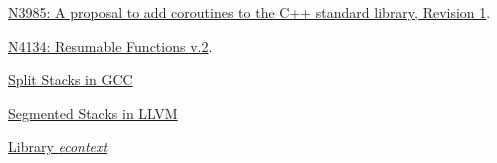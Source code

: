 \newpage
{}
\begin{thebibliography}{99}

        \href{http://www.open-std.org/jtc1/sc22/wg21/docs/papers/2014/n3985.pdf}
        {N3985: A proposal to add coroutines to the C++ standard library, Revision 1}.

        \href{http://www.open-std.org/jtc1/sc22/wg21/docs/papers/2014/n4134.pdf}
        {N4134: Resumable Functions v.2}.

        \href{http://gcc.gnu.org/wiki/SplitStacks}
        {Split Stacks in GCC}

        \href{http://llvm.org/releases/3.0/docs/SegmentedStacks.html}
        {Segmented Stacks in LLVM}

        \href{https://github.com/olk/econtext}
        {Library \textit{econtext}}

\end{thebibliography}
